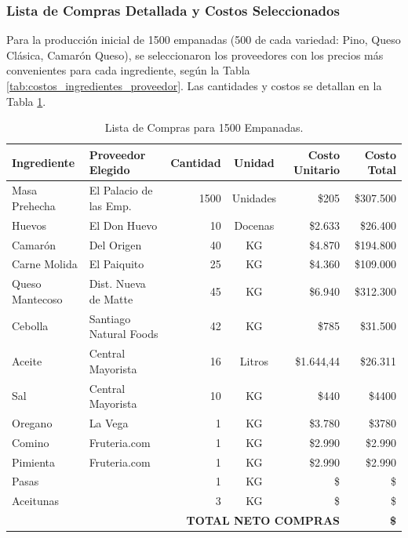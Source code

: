 \documentclass[12pt]{article}
\begin{document}
        \subsubsection{Lista de Compras Detallada y Costos Seleccionados}
        Para la producción inicial de 1500 empanadas (500 de cada variedad: Pino, Queso Clásica, Camarón Queso), se seleccionaron los proveedores con los precios más convenientes para cada ingrediente, según la Tabla \ref{tab:costos_ingredientes_proveedor}. Las cantidades y costos se detallan en la Tabla \ref{tab:lista_compras}.

        \begin{table}[H]
            \centering
            \small %
            \begin{tabular}{|l|l|r|c|r|r|}
                \hline
                \textbf{Ingrediente} & \textbf{Proveedor Elegido} & \textbf{Cantidad} & \textbf{Unidad} & \textbf{Costo Unitario} & \textbf{Costo Total} \\
                \hline
                Masa Prehecha & El Palacio de las Emp. & 1500 & Unidades & \$205 & \$307.500 \\
                Huevos & El Don Huevo & 10 & Docenas & \$2.633 & \$26.400 \\
                Camarón & Del Origen & 40 & KG & \$4.870 & \$194.800 \\
                Carne Molida & El Paiquito & 25 & KG & \$4.360 & \$109.000 \\
                Queso Mantecoso & Dist. Nueva de Matte & 45 & KG & \$6.940 & \$312.300 \\
                Cebolla & Santiago Natural Foods & 42 & KG & \$785 & \$31.500 \\
                Aceite & Central Mayorista & 16 & Litros & \$1.644,44 & \$26.311 \\
                Sal & Central Mayorista & 10 & KG & \$440 & \$4400 \\
                Oregano & La Vega & 1 & KG & \$3.780 & \$3780 \\
                Comino & Fruteria.com & 1 & KG & \$2.990 & \$2.990 \\
                Pimienta & Fruteria.com & 1 & KG & \$2.990 & \$2.990 \\
                Pasas &  & 1 & KG & \$ & \$ \\
                Aceitunas &  & 3 & KG & \$ & \$ \\
                \hline
                \multicolumn{5}{|r|}{\textbf{TOTAL NETO COMPRAS}} & \textbf{\$} \\
                \hline
            \end{tabular}
            \caption{Lista de Compras para 1500 Empanadas.}
            \label{tab:lista_compras}
        \end{table}
\end{document}
